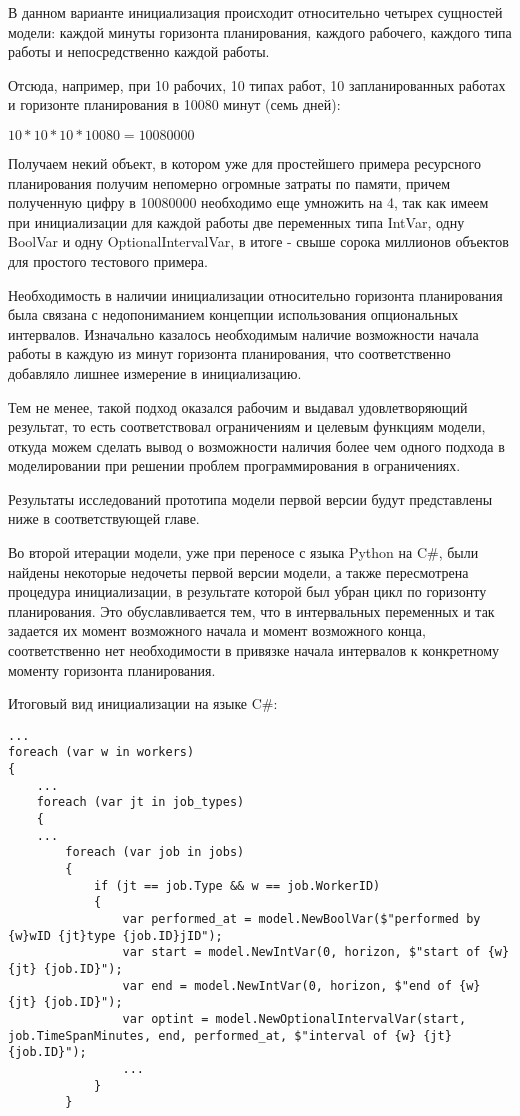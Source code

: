 В данном варианте инициализация происходит относительно четырех сущностей модели: каждой минуты горизонта планирования, каждого рабочего, каждого типа работы и непосредственно каждой работы.

Отсюда, например, при 10 рабочих, 10 типах работ, 10 запланированных работах и горизонте планирования в 10080 минут (семь дней):

$10 * 10 * 10 * 10080 = 10080000$

Получаем некий объект, в котором уже для простейшего примера ресурсного планирования получим непомерно огромные затраты по памяти, причем полученную цифру в 10080000 необходимо еще умножить на 4, так как имеем при инициализации для каждой работы две переменных типа IntVar, одну BoolVar и одну OptionalIntervalVar, в итоге - свыше сорока миллионов объектов для простого тестового примера.

Необходимость в наличии инициализации относительно горизонта планирования была связана с недопониманием концепции использования опциональных интервалов. Изначально казалось необходимым наличие возможности начала работы в каждую из минут горизонта планирования, что соответственно добавляло лишнее измерение в инициализацию.

Тем не менее, такой подход оказался рабочим и выдавал удовлетворяющий результат, то есть соответствовал ограничениям и целевым функциям модели, откуда можем сделать вывод о возможности наличия более чем одного подхода в моделировании при решении проблем программирования в ограничениях.

Результаты исследований прототипа модели первой версии будут представлены ниже в соответствующей главе.

Во второй итерации модели, уже при переносе с языка Python на C\#, были найдены некоторые недочеты первой версии модели, а также пересмотрена процедура инициализации, в результате которой был убран цикл по горизонту планирования. Это обуславливается тем, что в интервальных переменных и так задается их момент возможного начала и момент возможного конца, соответственно нет необходимости в привязке начала интервалов к конкретному моменту горизонта планирования.

Итоговый вид инициализации на языке C\#:

\begin{verbatim}
...
foreach (var w in workers)
{
    ...
    foreach (var jt in job_types)
    {
    ...
        foreach (var job in jobs)
        {
            if (jt == job.Type && w == job.WorkerID)
            {
                var performed_at = model.NewBoolVar($"performed by {w}wID {jt}type {job.ID}jID");
                var start = model.NewIntVar(0, horizon, $"start of {w} {jt} {job.ID}");
                var end = model.NewIntVar(0, horizon, $"end of {w} {jt} {job.ID}");
                var optint = model.NewOptionalIntervalVar(start, job.TimeSpanMinutes, end, performed_at, $"interval of {w} {jt} {job.ID}");
                ...
            }
        }
\end{verbatim}

